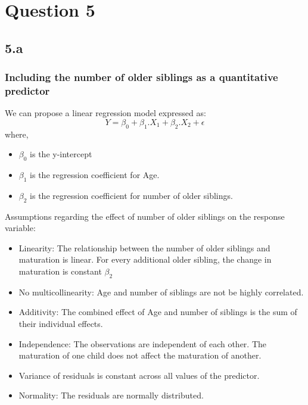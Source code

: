 \documentclass[12pt]{article}
\begin{document}
\newpage
\section*{Question 5}
\subsection*{5.a}
\subsubsection*{Including the number of older siblings as a quantitative predictor}
We can propose a linear regression model expressed as:
\[Y = \beta_0 + \beta_1. X_1 + \beta_2. X_2 + \epsilon\]
where,
\begin{itemize}
    \item \(\beta_0\) is the y-intercept
    \item \(\beta_1\) is the regression coefficient for Age.
    \item \(\beta_2\) is the regression coefficient for number of older siblings.
\end{itemize}
Assumptions regarding the effect of number of older siblings on the response variable:
\begin{itemize}
    \item Linearity: The relationship between the number of older siblings and
    maturation is linear. For every additional older sibling, the change in
    maturation is constant \(\beta_2\)
    \item No multicollinearity: Age and number of siblings are not be highly
    correlated.
    \item Additivity: The combined effect of Age and number of siblings is
    the sum of their individual effects.
    \item Independence: The observations are independent of each other. The
    maturation of one child does not affect the maturation of another.
    \item Variance of residuals is constant across all values of the predictor.
    \item Normality: The residuals are normally distributed.
\end{itemize}
\end{document}
